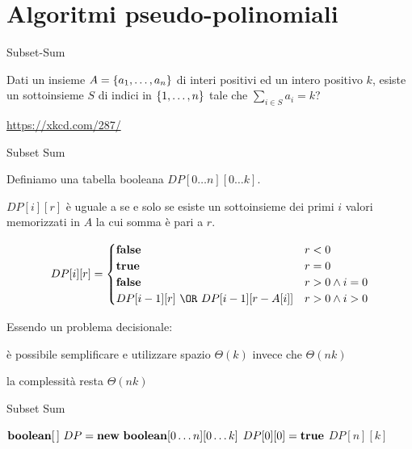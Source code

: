 \section{Algoritmi pseudo-polinomiali}

\begin{frame}{Subset-Sum}

\vspace{-9pt}
\begin{myboxtitle}
Dati un insieme $A = \{ a_1 , \ldots, a_n\}$ di interi positivi ed un intero
positivo $k$, esiste un sottoinsieme $S$ di indici in $\{1, \ldots, n\}$ tale
che $\sum_{i \in S} a_i = k$?
\end{myboxtitle}


\vfill
\tiny
\url{https://xkcd.com/287/}

\end{frame}

\begin{frame}{Subset Sum}

Definiamo una tabella booleana $DP[0 \ldots n][0 \ldots k]$. 

$DP[i][r]$ è uguale a \TRUE se e solo se esiste un sottoinsieme dei primi $i$ valori memorizzati in $A$ la cui somma è pari a $r$.

\[
DP[i][r] = \begin{cases}
  \FALSE & r < 0 \\
  \TRUE & r = 0 \\
  \FALSE & r > 0 \wedge i=0 \\
  DP[i-1][r]\ \OR\ DP[i-1][r-A[i]] & r>0 \wedge i>0
\end{cases}
\]

\bigskip
Essendo un problema decisionale:
\BIL 
\item è possibile semplificare e utilizzare spazio $\Theta(k)$ invece che $\Theta(nk)$
\item la complessità resta $\Theta(nk)$
\EIL

\end{frame}

\begin{frame}{Subset Sum}

\begin{Procedure}
\caption[A]{\BOOLEAN \subsetsum($\INTARRAY\ A,\ \INTEGER\ n,\ \INTEGER\ k$)}

$\BOOLEAN[\,]\ DP = \NEW\ \BOOLEAN[0 \mldots n][0 \mldots k]$\;
$DP[0][0] = \TRUE$\;
\Return $DP[n][k]$\;
\end{Procedure}

\end{frame}

